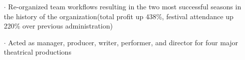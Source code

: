 \documentclass[a4paper, oneside, final]{scrartcl} %
\newcommand{\gray}{\rowcolor[gray]{.90}} %
\begin{document}
\begin{center}
\begin{itemize}
    \item[$\cdot$] Re-organized team workflows resulting in the two most successful seasons in the history of the organization(total profit up 438\%, festival attendance up 220\% over previous administration)\\
    \item[$\cdot$] Acted as manager, producer, writer, performer, and director for four major theatrical productions
  \end{itemize}

  \vspace{-0.05 cm}




\end{center}
\end{document}
